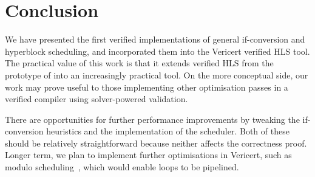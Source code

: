 {%

%

\section{Conclusion}

We have presented the first verified implementations of general if-conversion and hyperblock scheduling, and incorporated them into the Vericert verified HLS tool. The practical value of this work is that it extends verified HLS from the prototype of \textcite{herklotz21_formal_verif_high_level_synth} into an increasingly practical tool. On the more conceptual side, our work may prove useful to those implementing other optimisation passes in a verified compiler using solver-powered validation.

There are opportunities for further performance improvements by tweaking the if-conversion heuristics and the implementation of the scheduler. Both of these should be relatively straightforward because neither affects the correctness proof. Longer term, we plan to implement further optimisations in Vericert, such as modulo scheduling~\cite{zhang13_sdc}, which would enable loops to be pipelined.

}
